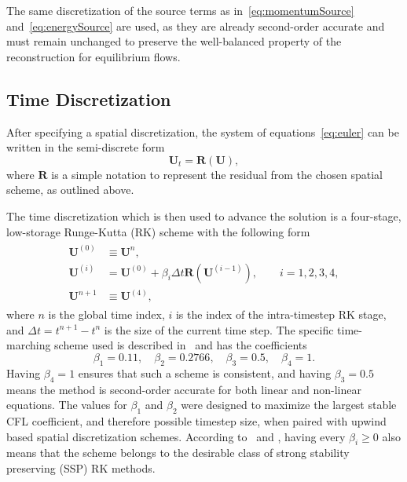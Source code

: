 The same discretization of the source terms as in~\eqref{eq:momentumSource} and~\eqref{eq:energySource} are used, as they are already second-order accurate and must remain unchanged to preserve the well-balanced property of the reconstruction for equilibrium flows.

\subsection{Time Discretization}
\label{subsec:time}

After specifying a spatial discretization, the system of equations~\eqref{eq:euler} can be written in the semi-discrete form
\begin{equation}
\mathbf{U}_t=\mathbf{R}(\mathbf{U}),
\end{equation}
where $\mathbf{R}$ is a simple notation to represent the residual from the chosen spatial scheme, as outlined above.

The time discretization which is then used to advance the solution is a four-stage, low-storage Runge-Kutta (RK) scheme with the following form
\begin{align}
\begin{split}
\mathbf{U}^{(0)} &\equiv \mathbf{U}^n,\\
\mathbf{U}^{(i)} &= \mathbf{U}^{(0)} + \beta_i \Delta t \mathbf{R} \left(\mathbf{U}^{(i-1)}\right),\qquad i=1,2,3,4,\\
\mathbf{U}^{n+1} &\equiv \mathbf{U}^{(4)},
\end{split}
\end{align}
where $n$ is the global time index, $i$ is the index of the intra-timestep RK stage, and $\Delta t=t^{n+1}-t^n$ is the size of the current time step. The specific time-marching scheme used is described in~\cite{Lallemand1990} and has the coefficients
\begin{equation}
\beta_1=0.11,\quad \beta_2=0.2766,\quad \beta_3=0.5,\quad \beta_4=1.
\end{equation}
Having $\beta_4=1$ ensures that such a scheme is consistent, and having $\beta_3=0.5$ means the method is second-order accurate for both linear and non-linear equations. The values for $\beta_1$ and $\beta_2$ were designed to maximize the largest stable CFL coefficient, and therefore possible timestep size, when paired with upwind based spatial discretization schemes. According to~\cite{Shu1988} and \cite{Macdonald2003}, having every $\beta_i \geq 0$ also means that the scheme belongs to the desirable class of strong stability preserving (SSP) RK methods.

